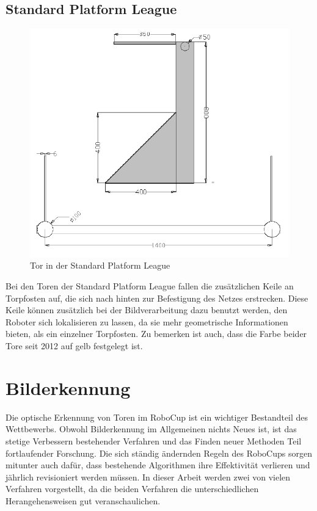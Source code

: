 \documentclass[a4paper,12pt]{article}
\begin{document}
\subsection{Standard Platform League}
\begin{figure}[H]
\includegraphics[scale=0.8]{spl-goal.png}
\caption{Tor in der Standard Platform League}
\label{fig:goal-spl}
\end{figure}
Bei den Toren der Standard Platform League fallen die zusätzlichen Keile an Torpfosten auf, die
sich nach hinten zur Befestigung des Netzes erstrecken. Diese Keile können zusätzlich bei der
Bildverarbeitung dazu benutzt werden, den Roboter sich lokalisieren zu lassen, da sie mehr
geometrische Informationen bieten, als ein einzelner Torpfosten. Zu bemerken ist auch, dass die
Farbe beider Tore seit 2012 auf gelb festgelegt ist.

\section{Bilderkennung}
Die optische Erkennung von Toren im RoboCup ist ein wichtiger Bestandteil des Wettbewerbs. Obwohl
Bilderkennung im Allgemeinen nichts Neues ist, ist das stetige Verbessern bestehender Verfahren und das
Finden neuer Methoden Teil fortlaufender Forschung. Die sich ständig ändernden Regeln des RoboCups
sorgen mitunter auch dafür, dass bestehende Algorithmen ihre Effektivität verlieren und jährlich
revisioniert werden müssen. In dieser Arbeit werden zwei von vielen Verfahren vorgestellt, da die
beiden Verfahren die unterschiedlichen Herangehensweisen gut veranschaulichen.
\end{document}
